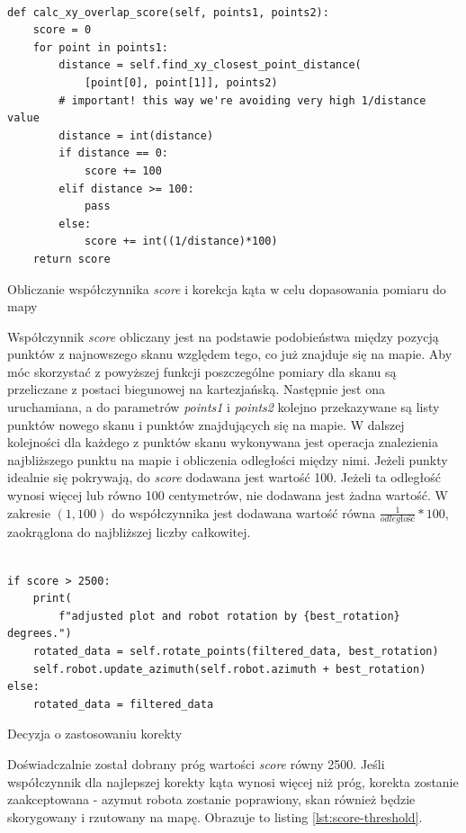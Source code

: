 \begin{listing}[H]
\begin{verbatim}

def calc_xy_overlap_score(self, points1, points2):
    score = 0
    for point in points1:
        distance = self.find_xy_closest_point_distance(
            [point[0], point[1]], points2)
        # important! this way we're avoiding very high 1/distance value
        distance = int(distance)
        if distance == 0:
            score += 100
        elif distance >= 100:
            pass
        else:
            score += int((1/distance)*100)
    return score
\end{verbatim}
\caption{Obliczanie współczynnika \emph{score} i korekcja kąta w celu dopasowania pomiaru do mapy}
\label{lst:score-angle-correction}
\end{listing}

Współczynnik \emph{score} obliczany jest na podstawie podobieństwa między pozycją punktów z najnowszego skanu względem tego, co już znajduje się na mapie. Aby móc skorzystać z powyższej funkcji poszczególne pomiary dla skanu są przeliczane z postaci biegunowej na kartezjańską. Następnie jest ona uruchamiana, a do parametrów \emph{points1} i \emph{points2} kolejno przekazywane są listy punktów nowego skanu i punktów znajdujących się na mapie. W dalszej kolejności dla każdego z punktów skanu wykonywana jest operacja znalezienia najbliższego punktu na mapie i obliczenia odległości między nimi. Jeżeli punkty idealnie się pokrywają, do \emph{score} dodawana jest wartość 100. Jeżeli ta odległość wynosi więcej lub równo 100 centymetrów, nie dodawana jest żadna wartość. W zakresie $(1,100)$ do współczynnika jest dodawana wartość równa $\frac{1}{odległość}*100$, zaokrąglona do najbliższej liczby całkowitej. 

\begin{listing}[H]
\begin{verbatim}

if score > 2500:
    print(
        f"adjusted plot and robot rotation by {best_rotation} degrees.")
    rotated_data = self.rotate_points(filtered_data, best_rotation)
    self.robot.update_azimuth(self.robot.azimuth + best_rotation)
else:
    rotated_data = filtered_data
\end{verbatim}
\caption{Decyzja o zastosowaniu korekty}
\label{lst:score-threshold}
\end{listing}

Doświadczalnie został dobrany próg wartości \emph{score} równy 2500. Jeśli współczynnik dla najlepszej korekty kąta wynosi więcej niż próg, korekta zostanie zaakceptowana - azymut robota zostanie poprawiony, skan również będzie skorygowany i rzutowany na mapę. Obrazuje to listing \ref{lst:score-threshold}.

